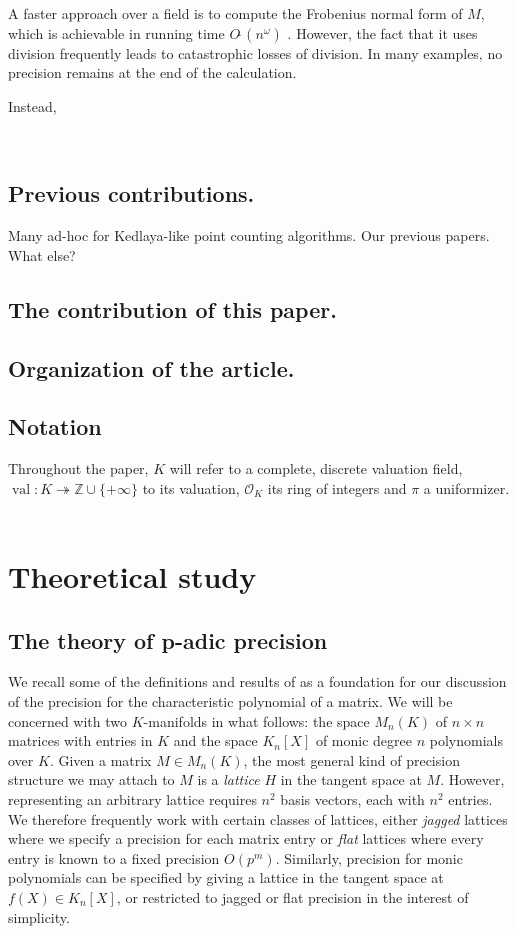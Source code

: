 \documentclass{sig-alternate-05-2015}
\DeclareMathOperator{\val}{val}
\newcommand{\Z}{\mathbb Z}
\newcommand{\OK}{\mathcal{O}_K}
\newcommand{\softO}{O\tilde{~}}
\def\todo#1{\ \!\!{\color{red} #1}}
\begin{document}
A faster approach over a field is to compute the Frobenius normal form of $M$,
which is achievable in running time $\softO(n^\omega)$ \cite{storjohann:01a}.
However, the fact that it uses division frequently leads to catastrophic losses of division.
In many examples, no precision remains at the end of the calculation.

Instead, 

\todo{Example of $M$ and $M + 1$.}



\subsection*{Previous contributions.} Many ad-hoc for Kedlaya-like point counting algorithms.  Our previous papers.  What else?

\subsection*{The contribution of this paper.} %

\subsection*{Organization of the article.}

\subsection*{Notation} Throughout the paper, $K$ will refer to a complete,
discrete valuation field, $\val : K \twoheadrightarrow \Z \cup \{+\infty\}$ to its valuation,
$\OK$ its ring of integers and $\pi$ a uniformizer. \todo{Soft-Oh}

\section{Theoretical study}

\subsection{The theory of p-adic precision}

We recall some of the definitions and results of \cite{caruso-roe-vaccon:14a}
as a foundation for our discussion of the precision for the characteristic polynomial
of a matrix.  We will be concerned with two $K$-manifolds in what follows:
the space $M_n(K)$ of $n \times n$ matrices with entries in $K$ and the space
$K_n[X]$ of monic degree $n$ polynomials over $K$.  Given a matrix $M \in M_n(K)$,
the most general kind of precision structure we may attach to $M$ is a
\emph{lattice} $H$ in the tangent space at $M$.  However, representing an
arbitrary lattice requires $n^2$ basis vectors, each with $n^2$ entries.  We therefore
frequently work with certain classes of lattices, either \emph{jagged} lattices
where we specify a precision for each matrix entry or \emph{flat} lattices where
every entry is known to a fixed precision $O(p^m)$.  Similarly, precision for
monic polynomials can be specified by giving a lattice in the tangent space
at $f(X) \in K_n[X]$, or restricted to jagged or flat precision in the interest
of simplicity.
\end{document}
